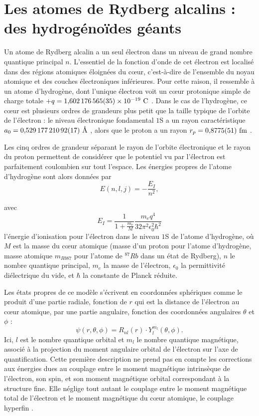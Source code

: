 \section{Les atomes de Rydberg alcalins : des hydrogénoïdes géants}\label{sec:alkalRydberg}
\noindent Un atome de Rydberg alcalin a un seul électron dans un niveau de grand nombre quantique principal $n$. L'essentiel de la fonction d'onde de cet électron est localisé dans des régions atomiques éloignées du c\oe ur, c'est-à-dire de l'ensemble du noyau atomique et des couches électroniques inférieures.
Pour cette raison, il ressemble à un atome d'hydrogène, dont l'unique électron voit un c\oe ur protonique simple de charge totale $+q=\numv{1.602176565(35)d-19}\si{\coulomb}$ \cite{MX_CODATA14}.
Dans le cas de l'hydrogène, ce c\oe ur est plusieurs ordres de grandeurs plus petit que la taille typique de l'orbite de l'électron : le niveau électronique fondamental $1$S a un \og rayon \fg{} caractéristique $a_0 = \numv{0,52917721092(17)}\si{\angstrom}$ \cite{MX_CODATA14}, alors que le proton a un rayon $r_p = \numv{0.8775(51)}\si{\femto\meter}$ \cite{MX_CODATA14}.

Les cinq ordres de grandeur séparant le rayon de l'orbite électronique et le rayon du proton permettent de considérer que le potentiel vu par l'électron est parfaitement coulombien sur tout l'espace.
Les énergies propres de l'atome d'hydrogène sont alors données par
\begin{equation}\label{eq:Hatom}
E(n,l,j)= - \frac{E_I}{n^2} ,
\end{equation}

avec
\begin{equation}\label{eq:E_I}
E_I = \frac{1}{1+\frac{m_e}{M}}\frac{m_e q^4}{32\pi^2 \epsilon _0^2 \hbar ^2}
\end{equation}
l'énergie d'ionisation pour l'électron dans le niveau $1$S de l'atome d'hydrogène, où $M$ est la masse du c\oe ur atomique (masse d'un proton pour l'atome d'hydrogène, masse atomique $m_{Rb87}$ pour l'atome de $^{87}Rb$ dans un état de Rydberg), $n$ le nombre quantique principal, $m_e$ la masse de l'électron, $\epsilon_0$ la permittivité diélectrique du vide, et $\hbar$ la constante de Planck réduite.

Les états propres de ce modèle s'écrivent en coordonnées sphériques comme le produit d'une partie radiale, fonction de $r$ qui est la distance de l'électron au c\oe ur atomique, par une partie angulaire, fonction des coordonnées angulaires $\theta$ et $\phi$ \cite{TXT_COHEN1FR} : 
\begin{equation}\label{eq:Hfonctonde}
\psi(r,\theta,\phi) = R_{nl}(r)\cdot Y_l^{m_l}(\theta,\phi).
\end{equation}
Ici, $l$ est le nombre quantique orbital et $m_l$ le nombre quantique magnétique, associé à la projection du moment angulaire orbital de l'électron sur l'axe de quantification.
Cette première description ne prend pas en compte les corrections aux énergies dues au couplage entre le moment magnétique intrinsèque de l'électron, son spin, et son moment magnétique orbital correspondant à la structure fine.
Elle néglige tout autant le couplage entre le moment magnétique total de l'électron et le moment magnétique du c\oe ur atomique, le couplage hyperfin \cite{TXT_COHEN2FR}.

